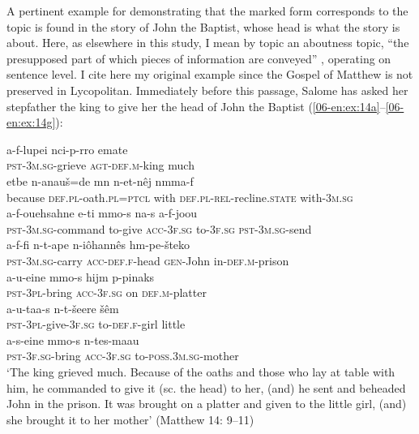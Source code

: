 \documentclass[output=paper]{LSP/langsci}
\begin{document}
A pertinent example for demonstrating that the marked form corresponds to the topic is found in the story of John the Baptist, whose head is what the story is about. Here, as elsewhere in this study, I mean by topic an aboutness topic,  \ie “the presupposed part of which pieces of information are conveyed” \citep[262]{Iemmolo2010Topicality}, operating on sentence level. I cite here my original  example since the Gospel of Matthew is not preserved in Lycopolitan. Immediately before this passage, Salome has asked her stepfather the king to give her the head of John the Baptist (\ref{06-en:ex:14a}--\ref{06-en:ex:14g}): 

\begin{exe}
\ex \label{06-en:ex:14}
\begin{xlist}
\ex \label{06-en:ex:14a}
\gll a-f-lupei 			nci-p-rro 			emate\\
	\textsc{pst-}\textsc{3m.sg-}grieve \textsc{agt-def.m-}king much \\

\ex \label{06-en:ex:14b}
\gll etbe 		n-anauš=de 		mn 		n-et-nêj 		nmma-f\\
	because \textsc{def.pl-}oath.\textsc{pl}=\textsc{ptcl} with \textsc{def.pl-}\textsc{rel-}recline.\textsc{state} with-\textsc{3m.sg}\\
\ex \label{06-en:ex:14c}
\gll a-f-ouehsahne 		e-ti 		mmo-s 		na-s 		a-f-joou\\
	\textsc{pst-}\textsc{3m.sg-}command to-give \textsc{acc-}\textsc{3f.sg} to-\textsc{3f.sg} \textsc{pst-}\textsc{3m.sg-}send\\

\ex \label{06-en:ex:14d}
\gll a-f-fi 				n-t-ape 		n-iôhannês 	hm-pe-šteko\\
	\textsc{pst-}\textsc{3m.sg-}carry \textsc{acc-}\textsc{def.f-}head \textsc{gen-}John in-\textsc{def.m-}prison\\

\ex \label{06-en:ex:14e}
\gll a-u-eine 		mmo-s 		hijm 	p-pinaks\\
	\textsc{pst-}\textsc{3pl-}bring \textsc{acc-}\textsc{3f.sg} on \textsc{def.m-}platter\\

\ex \label{06-en:ex:14f}
\gll a-u-taa-s 				n-t-šeere 		šêm\\
	\textsc{pst-}\textsc{3pl-}give-3\textsc{f.sg} to-\textsc{def.f-}girl little\\
				
\ex\label{06-en:ex:14g}
\gll a-s-eine 			mmo-s 		n-tes-maau\\
	\textsc{pst-}\textsc{3f.sg-}bring \textsc{acc-}\textsc{3f.sg} to-\textsc{poss.3m.sg-}mother\\
\glt ‘The king grieved much. Because of the oaths and those who lay at table with him, he commanded to give it (sc. the head) to her, (and) he sent and beheaded John in the prison. It was brought on a platter and given to the little girl, (and) she brought it to her mother’ (Matthew 14: 9–11)

\end{xlist}
\end{exe}
\end{document}
